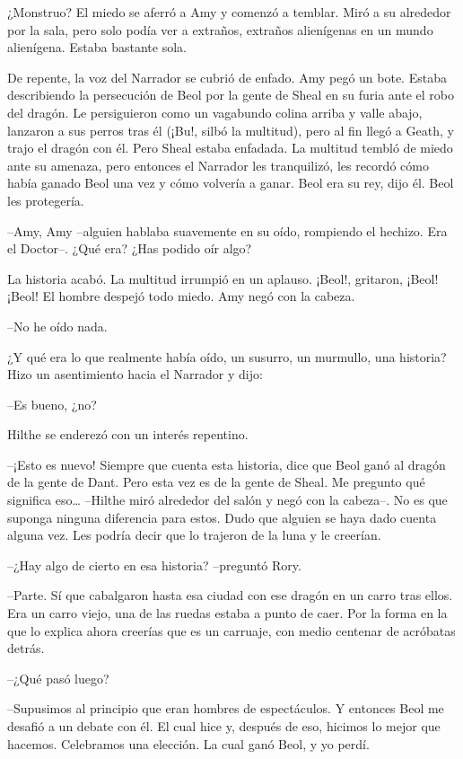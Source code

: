 {¿Monstruo? El miedo se aferró a Amy y comenzó a temblar. Miró a su
	alrededor por la sala, pero solo podía ver a extraños, extraños
alienígenas en un mundo alienígena. Estaba bastante sola.}

{De repente, la voz del Narrador se cubrió de enfado. Amy pegó un bote.
	Estaba describiendo la persecución de Beol por la gente de Sheal en su
	furia ante el robo del dragón. Le persiguieron como un vagabundo colina
	arriba y valle abajo, lanzaron a sus perros tras él (¡Bu!, silbó la
	multitud), pero al fin llegó a Geath, y trajo el dragón con él. Pero
	Sheal estaba enfadada. La multitud tembló de miedo ante su amenaza, pero
	entonces el Narrador les tranquilizó, les recordó cómo había ganado Beol
	una vez y cómo volvería a ganar. Beol era su rey, dijo él. Beol les
protegería.}

{--Amy, Amy --alguien hablaba suavemente en su oído, rompiendo el
hechizo. Era el Doctor--. ¿Qué era? ¿Has podido oír algo?}

{La historia acabó. La multitud irrumpió en un aplauso. ¡Beol!,
	gritaron, ¡Beol! ¡Beol! El hombre despejó todo miedo. Amy negó con la
cabeza.}

{--No he oído nada.}

{¿Y qué era lo que realmente había oído, un susurro, un murmullo, una
historia? Hizo un asentimiento hacia el Narrador y dijo:}

{--Es bueno, ¿no?}

{Hilthe se enderezó con un interés repentino.}

{--¡Esto es nuevo! Siempre que cuenta esta historia, dice que Beol
	ganó al dragón de la gente de Dant. Pero esta vez es de la gente de
	Sheal. Me pregunto qué significa eso\ldots{} --Hilthe miró alrededor del
	salón y negó con la cabeza--. No es que suponga ninguna diferencia para
	estos. Dudo que alguien se haya dado cuenta alguna vez. Les podría decir
que lo trajeron de la luna y le creerían.}

{--¿Hay algo de cierto en esa historia? --preguntó Rory.}

{--Parte. Sí que cabalgaron hasta esa ciudad con ese dragón en un
	carro tras ellos. Era un carro viejo, una de las ruedas estaba a punto
	de caer. Por la forma en la que lo explica ahora creerías que es un
carruaje, con medio centenar de acróbatas detrás.}

{--¿Qué pasó luego?}

{--Supusimos al principio que eran hombres de espectáculos. Y entonces
	Beol me desafió a un debate con él. El cual hice y, después de eso,
	hicimos lo mejor que hacemos. Celebramos una elección. La cual ganó
Beol, y yo perdí.}

